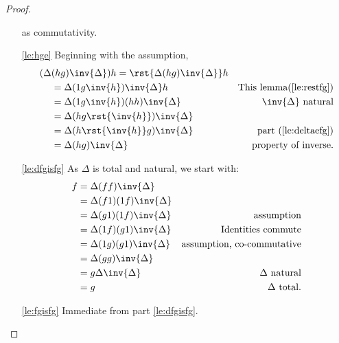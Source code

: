 \begin{proof}
\begin{enumerate}[{(}i{)}]
      as commutativity.
    \item[\ref{le:hge}]Beginning with the assumption,
      \begin{align*}
        (\Delta &(h \* g)\inv{\Delta})h  = \rst{\Delta (h \* g) \inv{\Delta}}h&\\
        &=\Delta(1 \* g \inv{h}) \inv{\Delta}h&\text{This lemma(\ref{le:restfg})}\\
        &=\Delta(1 \* g \inv{h}) (h\*h)\inv{\Delta}&\inv{\Delta}\text{ natural}\\
        &=\Delta(h \* g \rst{\inv{h}}) \inv{\Delta}&\\
        &=\Delta(h\rst{\inv{h}} \* g) \inv{\Delta}&\text{part (\ref{le:deltaefg})}\\
         &=\Delta(h\*g)\inv{\Delta}&\text{property of inverse}.
      \end{align*}

    \item[\ref{le:dfgisfg}]As $\Delta$ is total and natural, we start with:
      \begin{align*}
        f&=\Delta(f\*f)\inv{\Delta}  & \\
        &= \Delta(f\*1)(1\*f)\inv{\Delta} &  \\
        &= \Delta(g\*1)(1\*f)\inv{\Delta} &\text{assumption} \\
        &= \Delta(1\*f)(g\*1)\inv{\Delta} &\text{Identities commute}\\
        &= \Delta(1\*g)(g\*1)\inv{\Delta} &\text{assumption, co-commutative}\\
        &= \Delta(g\*g)\inv{\Delta} \\
        &= g\Delta\inv{\Delta} & \Delta \text{ natural}\\
        &= g&\Delta\text{ total}.
      \end{align*}
    \item[\ref{le:fgisfg}] Immediate from part \ref{le:dfgisfg}.
  \end{enumerate}
\end{proof}


